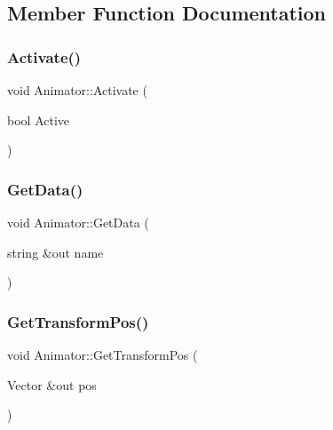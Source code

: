 \subsection{Member Function Documentation}
\hypertarget{class_animator_a0356da392e1c8e4506d547a9840f755b}{}\label{class_animator_a0356da392e1c8e4506d547a9840f755b} 
\subsubsection{\texorpdfstring{Activate()}{Activate()}}
{\footnotesize\ttfamily void Animator\+::\+Activate (\begin{DoxyParamCaption}\item[{bool}]{Active }\end{DoxyParamCaption})}

\hypertarget{class_animator_aa1d32092436576c0cc3fc97048cac2d0}{}\label{class_animator_aa1d32092436576c0cc3fc97048cac2d0} 
\subsubsection{\texorpdfstring{Get\+Data()}{GetData()}}
{\footnotesize\ttfamily void Animator\+::\+Get\+Data (\begin{DoxyParamCaption}\item[{string \&out}]{name }\end{DoxyParamCaption})}

\hypertarget{class_animator_a2a0fdefbe031f918dd1ea5503a2f770d}{}\label{class_animator_a2a0fdefbe031f918dd1ea5503a2f770d} 
\subsubsection{\texorpdfstring{Get\+Transform\+Pos()}{GetTransformPos()}}
{\footnotesize\ttfamily void Animator\+::\+Get\+Transform\+Pos (\begin{DoxyParamCaption}\item[{Vector \&out}]{pos }\end{DoxyParamCaption})}

\hypertarget{class_animator_a4b4566e439e855df6e58e73d60e91e4b}{}\label{class_animator_a4b4566e439e855df6e58e73d60e91e4b} 
